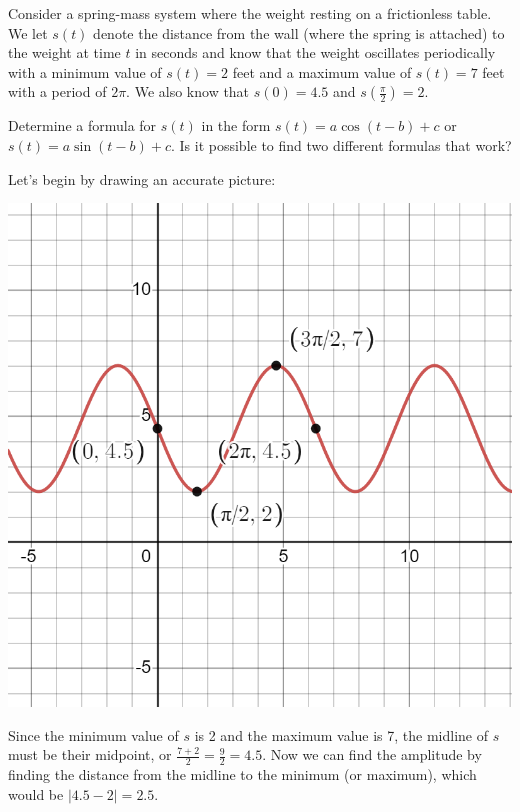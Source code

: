 \documentclass{ximera}
\begin{document}
\begin{example}
Consider a spring-mass system where the weight resting on a frictionless table.  We let \(s(t)\) denote the distance from the wall (where the spring is attached) to the weight at time \(t\) in seconds and know that the weight oscillates periodically with a minimum value of \(s(t) = 2\) feet and a maximum value of \(s(t) = 7\) feet with a period of \(2 \pi\).  We also know that \(s(0) = 4.5\) and \(s\left(\frac{\pi}{2}\right) = 2\).%

Determine a formula for \(s(t)\) in the form \(s(t) = a\cos(t-b)+c\) or \(s(t) = a\sin(t-b)+c\).  Is it possible to find two different formulas that work?  

\begin{explanation}
Let's begin by drawing an accurate picture:
\begin{image}
\includegraphics[width=0.8\linewidth]{images/spring-ex.png}
\end{image}

Since the minimum value of $s$ is 2 and the maximum value is 7, the midline of $s$ must be their midpoint, or $\frac{7+2}{2} = \frac{9}{2} = 4.5$. Now we can find the amplitude by finding the distance from the midline to the minimum (or maximum), which would be $|4.5 - 2| = 2.5$. 


\end{explanation}
\end{example}
\end{document}
